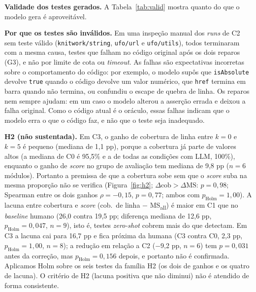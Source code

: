\documentclass[12pt]{article}
\begin{document}
\textbf{Validade dos testes gerados.} A Tabela~\ref{tab:valid} mostra quanto do que o modelo gera é aproveitável.


\begin{table}[t]
\centering\small

\caption{Validade dos testes gerados por condição. ``Runs válidos'': ao menos uma iteração aprovada nos guardrails e no código original.
Falhas de infraestrutura (cota, \textit{timeout}) não são contadas.}
\label{tab:valid}
\end{table}

\textbf{Por que os testes são inválidos.} Em uma inspeção manual dos \textit{runs} de C2 sem teste válido
(\texttt{knitwork/string}, \texttt{ufo/url} e \texttt{ufo/utils}), todos terminaram com a mesma causa, testes que
falham no código original após os dois reparos (G3), e não por limite de cota ou \textit{timeout}. As falhas são
expectativas incorretas sobre o comportamento do código: por exemplo, o modelo supôs que \texttt{isAbsolute} devolve
\texttt{true} quando o código devolve um valor numérico, que \texttt{href} termina em barra quando não termina, ou
confundiu o escape de quebra de linha. Os reparos nem sempre ajudam: em um caso o modelo alterou a asserção errada e deixou a
falha original. Como o código atual é o oráculo, essas falhas indicam que o modelo erra o que o código faz, e não que o teste
seja inadequado.

\textbf{H2 (não sustentada).} Em C3, o ganho de cobertura de linha entre $k=0$ e $k=5$ é pequeno (mediana de 1,1 pp), porque a
cobertura já parte de valores altos (a mediana de C0 é 95,5\% e a de todas as condições com LLM, 100\%), enquanto o ganho de
\textit{score} no grupo de avaliação tem mediana de 9,8 pp ($n=6$ módulos). Portanto a premissa de que a cobertura sobe sem que o
\textit{score} suba na mesma proporção não se verifica (Figura~\ref{fig:h2}; $\Delta\text{cob}>\Delta\text{MS}$: $p=0{,}98$; Spearman entre os dois ganhos
$\rho=-0{,}15$, $p=0{,}77$; ambos com $p_{\text{Holm}}=1{,}00$). A lacuna entre cobertura e \textit{score} (cob.\ de linha $-$ MS\textsubscript{all}) é maior em C1 que no
\textit{baseline} humano (26,0 contra 19,5 pp; diferença mediana de 12,6 pp, $p_{\text{Holm}}=0{,}047$, $n=9$), isto é, testes
\textit{zero-shot} cobrem mais do que detectam. Em C3 a lacuna cai para 16,7 pp e fica próxima da humana (C3 contra C0, 2,3 pp,
$p_{\text{Holm}}=1{,}00$, $n=8$); a redução em relação a C2 ($-$9,2 pp, $n=6$) tem $p=0{,}031$ antes da correção, mas
$p_{\text{Holm}}=0{,}156$ depois, e portanto não é confirmada. Aplicamos Holm sobre os seis testes da família H2 (os dois de
ganhos e os quatro de lacuna). O critério de H2 (lacuna positiva que não diminui) não é atendido de forma consistente.
\end{document}
